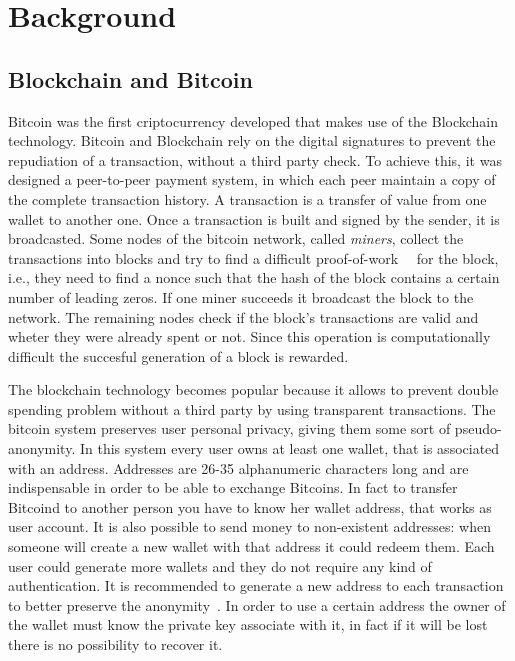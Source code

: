 \section{Background}
\subsection{Blockchain and Bitcoin}
Bitcoin was the first criptocurrency developed that makes use of the Blockchain
technology. Bitcoin and Blockchain rely on the digital signatures
to prevent the repudiation of a transaction, without a third party check.
To achieve this, it was designed a peer-to-peer payment system, in which each
peer maintain a copy of the complete transaction history.
A transaction is a transfer of value from one wallet to another one.
Once a transaction is built and signed by the sender, it is broadcasted.
Some nodes of the bitcoin network, called \textit{miners}, collect the
transactions into blocks and try to find a difficult
proof-of-work~\cite{pricing}~\cite{hashcash} for the
block, i.e., they need to find a nonce such that the hash of the block contains
a certain number of leading zeros. 
If one miner succeeds it broadcast the block to the network.
The remaining nodes check if the block's transactions are valid and wheter
they were already spent or not.
Since this operation is computationally difficult the succesful generation
of a block is rewarded.

The blockchain technology becomes popular because it allows
to prevent double spending problem without a third party by using
transparent transactions.
The bitcoin system preserves user personal privacy, giving them some sort of
pseudo-anonymity.
In this system every user owns at least one wallet, that is associated with an
address. Addresses are 26-35 alphanumeric characters long and are indispensable
in order to be able to exchange Bitcoins. In fact to transfer Bitcoind to
another person you have to know her wallet address, that works as user account.
It is also possible to send money to non-existent addresses: when someone will
create a new wallet with that address it could redeem them.
Each user could generate more wallets and they do not require any kind of
authentication. It is recommended to generate a new address to each transaction
to better preserve the anonymity~\cite{satoshi}.
In order to use a certain address the
owner of the wallet must know the private key associate with it, in fact if it
will be lost there is no possibility to recover it. 


